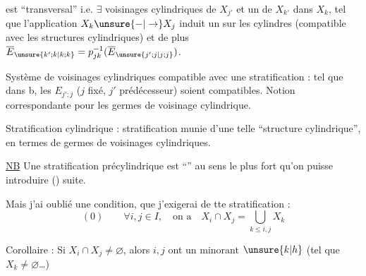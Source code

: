 est ``transversal'' i.e.  $\exists$ voisinages cylindriques
de $X_{j'}$  et un de $X_{k'}$ dans $X_k$, tel que l'application
$X_k\unsure{-|\to}X_j$ induit un  sur les
cylindres (compatible avec les structures
cylindriques) et de plus
$\overline E_{\unsure{k';k|k;k}}=p_{jk}^{-1}(\overline E_{\unsure{j';j|j;j}})$.

Système de voisinages cylindriques 
compatible avec une stratification : tel que
dans b, les $E_{j';j}$ ($j$ fixé, $j'$ prédécesseur)
soient compatibles. Notion correspondante
pour les germes de voisinage cylindrique.

Stratification cylindrique : stratification munie
d'une telle ``structure cylindrique'', en
termes de germes de voisinages cylindriques.

\uline{NB} Une stratification précylindrique 
est 
``'' au sens le plus fort qu'on
puisse introduire  () suite.

Mais j'ai oublié une condition, que j'exigerai
de tte stratification :
\[
(0)\qquad \forall i,j\in I,\quad\text{on a}\quad
X_i\cap X_j=\bigcup_{k\le i,j}X_k
\]

Corollaire : Si $X_i\cap X_j\ne\varnothing$, alors $i,j$ ont un
minorant $\unsure{k|h}$ (tel que  $X_k\ne\varnothing$\ldots)
